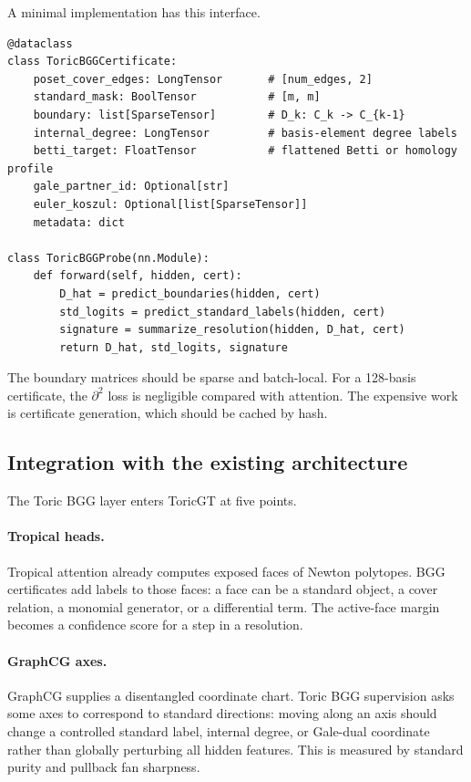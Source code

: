 \documentclass[11pt]{article}
\theoremstyle{definition}
\theoremstyle{plain}
\theoremstyle{remark}
\numberwithin{equation}{section}
\begin{document}
A minimal implementation has this interface.
\begin{verbatim}
@dataclass
class ToricBGGCertificate:
    poset_cover_edges: LongTensor       # [num_edges, 2]
    standard_mask: BoolTensor           # [m, m]
    boundary: list[SparseTensor]        # D_k: C_k -> C_{k-1}
    internal_degree: LongTensor         # basis-element degree labels
    betti_target: FloatTensor           # flattened Betti or homology profile
    gale_partner_id: Optional[str]
    euler_koszul: Optional[list[SparseTensor]]
    metadata: dict

class ToricBGGProbe(nn.Module):
    def forward(self, hidden, cert):
        D_hat = predict_boundaries(hidden, cert)
        std_logits = predict_standard_labels(hidden, cert)
        signature = summarize_resolution(hidden, D_hat, cert)
        return D_hat, std_logits, signature
\end{verbatim}
The boundary matrices should be sparse and batch-local.  For a 128-basis certificate, the $\partial^2$ loss is negligible compared with attention.  The expensive work is certificate generation, which should be cached by hash.

\subsection{Integration with the existing architecture}

The Toric BGG layer enters ToricGT at five points.

\paragraph{Tropical heads.}
Tropical attention already computes exposed faces of Newton polytopes.  BGG certificates add labels to those faces: a face can be a standard object, a cover relation, a monomial generator, or a differential term.  The active-face margin becomes a confidence score for a step in a resolution.

\paragraph{GraphCG axes.}
GraphCG supplies a disentangled coordinate chart.  Toric BGG supervision asks some axes to correspond to standard directions: moving along an axis should change a controlled standard label, internal degree, or Gale-dual coordinate rather than globally perturbing all hidden features.  This is measured by standard purity and pullback fan sharpness.
\end{document}
